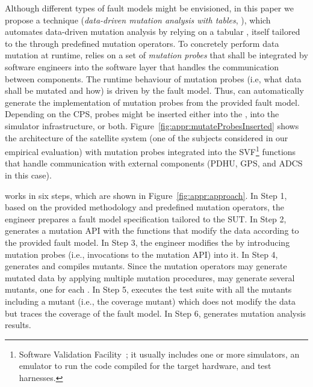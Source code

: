 Although different types of fault models might be envisioned,
in this paper we propose a technique (\emph{data-driven mutation analysis with tables}, \APPR),
which automates data-driven mutation analysis by relying on
a tabular , itself tailored to the  through predefined mutation operators.
To concretely perform data mutation at runtime, \APPR relies on a set of \emph{mutation probes} that shall be integrated by software engineers into the software layer that handles the communication between components. The runtime behaviour of mutation probes (i.e, what data shall be mutated and how) is driven by the fault model. Thus, \APPR can automatically generate the implementation of mutation probes from the provided fault model.
Depending on the CPS, probes might be inserted either into the , into the simulator infrastructure, or both.
Figure~\ref{fig:appr:mutateProbesInserted} shows the architecture of the \ESAIL satellite system (one of the subjects considered in our empirical evaluation) with mutation probes integrated into the SVF\footnote{Software Validation Facility~\cite{Isasi2019}; it usually includes one or more simulators, an emulator to run the code compiled for the target hardware, and test harnesses.} functions that handle communication with external components (PDHU, GPS, and ADCS in this case). 



\APPR works in six steps, which are shown in Figure~\ref{fig:appr:approach}. 
In Step 1, based on the provided methodology and predefined mutation operators, the engineer prepares a fault model specification tailored to the SUT.
In Step 2, \APPR generates a mutation API with the functions that modify the data according to the provided fault model.
In Step 3, the engineer modifies the  by introducing mutation probes (i.e., invocations to the mutation API) into it.
In Step 4, \APPR generates and compiles mutants. 
Since the \APPR mutation operators may generate mutated data by applying multiple mutation procedures, \APPR may generate several mutants, one for each .
In Step 5, \APPR executes the test suite with all the mutants including a mutant (i.e., the coverage mutant) which does not  modify the data but traces the coverage of the fault model.
In Step 6, \APPR generates mutation analysis results.

